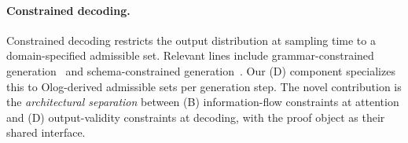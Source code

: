 \paragraph{Constrained decoding.}
Constrained decoding restricts the output distribution at sampling time
to a domain-specified admissible set. Relevant lines include
grammar-constrained generation~\cite{geng2023flexiblegrammar} and
schema-constrained generation~\cite{willard2023outlines}. Our (D) component
specializes this to Olog-derived admissible sets per generation step.
The novel contribution is the \emph{architectural separation} between (B)
information-flow constraints at attention and (D) output-validity
constraints at decoding, with the proof object as their shared interface.
